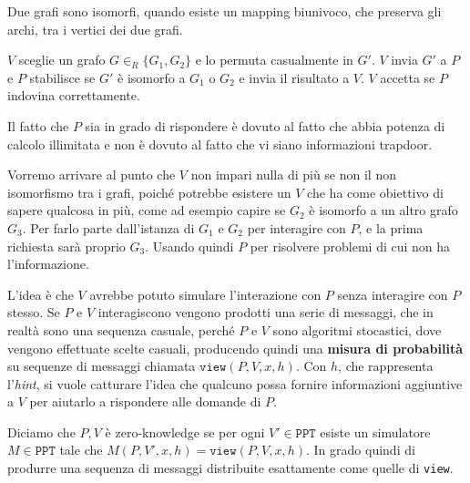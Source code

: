 \begin{tcolorbox}[title=Isomorfismo di grafi]
    Due grafi sono isomorfi, quando esiste un mapping biunivoco, che preserva 
    gli archi, tra i vertici dei due grafi.
\end{tcolorbox}

$V$ sceglie un grafo $G\in_R \{G_1, G_2\}$ e lo permuta casualmente in $G'$. $V$ invia $G'$ a $P$ e $P$ 
stabilisce se $G'$ è isomorfo a $G_1$ o $G_2$ e invia il risultato a $V$. $V$ accetta se $P$ indovina correttamente.

Il fatto che $P$ sia in grado di rispondere è dovuto al fatto che abbia potenza di calcolo illimitata e non 
è dovuto al fatto che vi siano informazioni trapdoor. 

Vorremo arrivare al punto che $V$ non impari nulla di più se non il non isomorfismo tra i grafi, poiché 
potrebbe esistere un $V$ che ha come obiettivo di sapere qualcosa in più, come ad esempio capire se $G_2$
è isomorfo a un altro grafo $G_3$. Per farlo parte dall'istanza di $G_1$ e $G_2$ per interagire con $P$, 
e la prima richiesta sarà proprio $G_3$. Usando quindi $P$ per risolvere problemi di cui non ha 
l'informazione. 

L'idea è che $V$ avrebbe potuto simulare l'interazione con $P$ senza interagire con $P$ stesso.
Se $P$ e $V$ interagiscono vengono prodotti una serie di messaggi, che in realtà sono una sequenza casuale,
perché $P$ e $V$ sono algoritmi stocastici, dove vengono effettuate scelte casuali, producendo quindi
una \textbf{misura di probabilità} su sequenze di messaggi chiamata $\texttt{view}(P,V,x,h)$. 
Con $h$, che rappresenta l'\textit{hint}, si vuole catturare l'idea che qualcuno possa fornire informazioni 
aggiuntive a $V$ per aiutarlo a rispondere alle domande di $P$.

\begin{tcolorbox}
    Diciamo che $P,V$ è zero-knowledge se per ogni $V'\in \texttt{PPT}$ esiste un simulatore $M \in \texttt{PPT}$
    tale che $M(P,V',x,h) = \texttt{view}(P,V,x,h)$. In grado quindi di produrre una sequenza di messaggi
    distribuite esattamente come quelle di \texttt{view}.   
\end{tcolorbox} 
